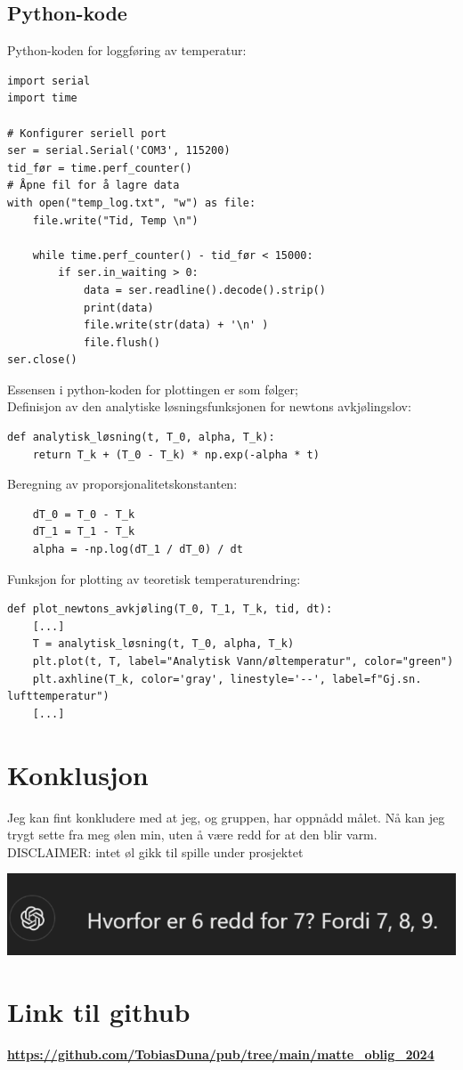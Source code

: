\documentclass{article}
\begin{document}
\subsection{Python-kode}
\label{Python}
Python-koden for loggføring av temperatur:
\begin{verbatim}
import serial
import time

# Konfigurer seriell port
ser = serial.Serial('COM3', 115200)
tid_før = time.perf_counter()
# Åpne fil for å lagre data
with open("temp_log.txt", "w") as file:
    file.write("Tid, Temp \n")

    while time.perf_counter() - tid_før < 15000:
        if ser.in_waiting > 0:
            data = ser.readline().decode().strip()
            print(data)
            file.write(str(data) + '\n' )
            file.flush()
ser.close()
\end{verbatim}
Essensen i python-koden for plottingen er som følger;\\
Definisjon av den analytiske løsningsfunksjonen for newtons avkjølingslov:
\begin{verbatim}
def analytisk_løsning(t, T_0, alpha, T_k):
    return T_k + (T_0 - T_k) * np.exp(-alpha * t)
\end{verbatim}
Beregning av proporsjonalitetskonstanten:
\begin{verbatim}
    dT_0 = T_0 - T_k
    dT_1 = T_1 - T_k
    alpha = -np.log(dT_1 / dT_0) / dt
\end{verbatim}
Funksjon for plotting av teoretisk temperaturendring:
\begin{verbatim}
def plot_newtons_avkjøling(T_0, T_1, T_k, tid, dt): 
    [...]
    T = analytisk_løsning(t, T_0, alpha, T_k)
    plt.plot(t, T, label="Analytisk Vann/øltemperatur", color="green")
    plt.axhline(T_k, color='gray', linestyle='--', label=f"Gj.sn. lufttemperatur")
    [...]
\end{verbatim}

\section{Konklusjon}
\label{Konklusjon}
Jeg kan fint konkludere med at jeg, og gruppen, har oppnådd målet. Nå kan jeg trygt sette fra meg ølen min, uten å være redd for at den blir varm.
\vfill
DISCLAIMER: intet øl gikk til spille under prosjektet

\begin{center}
    \includegraphics{GPT_math_joke.png}
\end{center}

\appendix
\small \section{Link til github}
\label{github}
\textbf{\url{https://github.com/TobiasDuna/pub/tree/main/matte_oblig_2024}}
\end{document}

